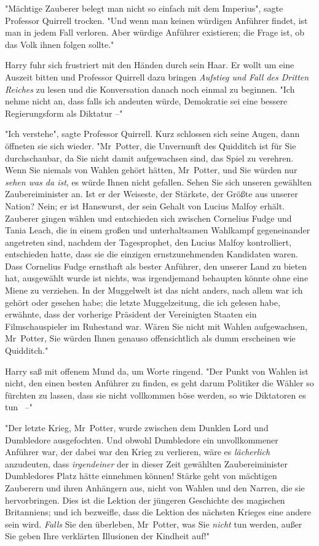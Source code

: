 {"Mächtige Zauberer belegt man nicht so einfach mit dem Imperius", sagte Professor Quirrell trocken. "Und wenn man keinen würdigen Anführer findet, ist man in jedem Fall verloren. Aber würdige Anführer existieren; die Frage ist, ob das Volk ihnen folgen sollte."

Harry fuhr sich frustriert mit den Händen durch sein Haar. Er wollt um eine Auszeit bitten und Professor Quirrell dazu bringen \emph{Aufstieg und Fall des Dritten Reiches} zu lesen und die Konversation danach noch einmal zu beginnen. "Ich nehme nicht an, dass falls ich andeuten würde, Demokratie sei eine bessere Regierungsform als Diktatur --"

"Ich verstehe", sagte Professor Quirrell. Kurz schlossen sich seine Augen, dann öffneten sie sich wieder. "Mr~Potter, die Unvernunft des Quidditch ist für Sie durchschaubar, da Sie nicht damit aufgewachsen sind, das Spiel zu verehren. Wenn Sie niemals von Wahlen gehört hätten, Mr~Potter, und Sie würden nur \emph{sehen was da ist}, es würde Ihnen nicht gefallen. Sehen Sie sich unseren gewählten Zaubereiminister an. Ist er der Weiseste, der Stärkste, der Größte aus unserer Nation? Nein; er ist Hanswurst, der sein Gehalt von Lucius Malfoy erhält. Zauberer gingen wählen und entschieden sich zwischen Cornelius Fudge und Tania Leach, die in einem großen und unterhaltsamen Wahlkampf gegeneinander angetreten sind, nachdem der Tagesprophet, den Lucius Malfoy kontrolliert, entschieden hatte, dass sie die einzigen ernstzunehmenden Kandidaten waren. Dass Cornelius Fudge ernsthaft als bester Anführer, den unserer Land zu bieten hat, ausgewählt wurde ist nichts, was irgendjemand behaupten könnte ohne eine Miene zu verziehen. In der Muggelwelt ist das nicht anders, nach allem war ich gehört oder gesehen habe; die letzte Muggelzeitung, die ich gelesen habe, erwähnte, dass der vorherige Präsident der Vereinigten Staaten ein Filmschauspieler im Ruhestand war. Wären Sie nicht mit Wahlen aufgewachsen, Mr~Potter, Sie würden Ihnen genauso offensichtlich als dumm erscheinen wie Quidditch."

Harry saß mit offenem Mund da, um Worte ringend. "Der Punkt von Wahlen ist nicht, den einen besten Anführer zu finden, es geht darum Politiker die Wähler so fürchten zu lassen, dass sie nicht vollkommen böse werden, so wie Diktatoren es tun ~--"

"Der letzte Krieg, Mr~Potter, wurde zwischen dem Dunklen Lord und Dumbledore ausgefochten. Und obwohl Dumbledore ein unvollkommener Anführer war, der dabei war den Krieg zu verlieren, wäre es \emph{lächerlich} anzudeuten, dass \emph{irgendeiner} der in dieser Zeit gewählten Zaubereiminister Dumbledores Platz hätte einnehmen können! Stärke geht von mächtigen Zauberern und ihren Anhängern aus, nicht von Wahlen und den Narren, die sie hervorbringen. Dies ist die Lektion der jüngeren Geschichte des magischen Britanniens; und ich bezweifle, dass die Lektion des nächsten Krieges eine andere sein wird. \emph{Falls} Sie den überleben, Mr~Potter, was Sie \emph{nicht} tun werden, außer Sie geben Ihre verklärten Illusionen der Kindheit auf!"

}
